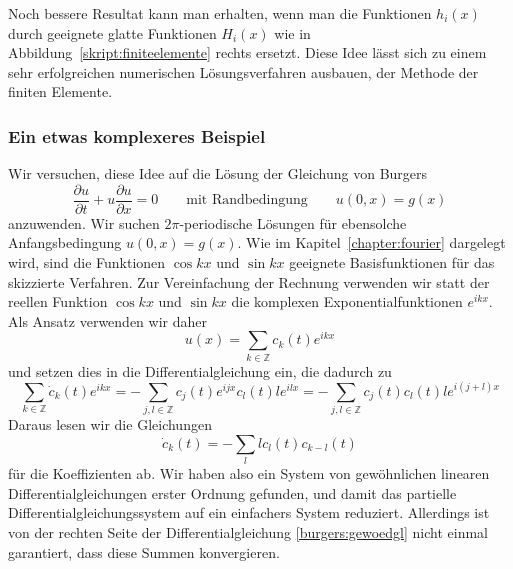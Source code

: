 Noch bessere Resultat kann man erhalten, wenn man die Funktionen
$h_i(x)$ durch geeignete glatte Funktionen $H_i(x)$ wie in
Abbildung~\ref{skript:finiteelemente} rechts ersetzt.
Diese Idee lässt sich zu einem sehr erfolgreichen numerischen
Lösungsverfahren ausbauen, der Methode der finiten Elemente.

\subsubsection{Ein etwas komplexeres Beispiel}
Wir versuchen, diese Idee auf die Lösung der Gleichung von
Burgers
\begin{equation}
\frac{\partial u}{\partial t} + u\frac{\partial u}{\partial x}=0
\qquad\text{mit Randbedingung}\qquad
u(0,x)=g(x)
\label{skript:pde:burgersequation}
\end{equation}
anzuwenden.
Wir suchen $2\pi$-periodische Lösungen für ebensolche Anfangsbedingung
$u(0,x)=g(x)$.
Wie im Kapitel~\ref{chapter:fourier} dargelegt wird, sind die Funktionen
$\cos kx$ und $\sin kx$ geeignete Basisfunktionen für das skizzierte Verfahren.
Zur Vereinfachung der Rechnung verwenden wir statt der reellen Funktion
$\cos kx$ und $\sin kx$ die komplexen Exponentialfunktionen $e^{ikx}$.
Als Ansatz verwenden wir daher
\[
u(x) = \sum_{k\in\mathbb Z} c_k(t) e^{ikx}
\]
und setzen dies in die Differentialgleichung ein, die dadurch zu
\[
\sum_{k\in\mathbb Z} \dot c_k(t) e^{ikx}
=
-\sum_{j,l\in\mathbb Z} c_j(t)e^{ijx} c_l(t) le^{ilx}
=
-\sum_{j,l\in\mathbb Z} c_j(t)c_l(t) le^{i(j+l)x}
\]
Daraus lesen wir die Gleichungen
\begin{equation}
\dot c_k(t) = -\sum_{l} lc_l(t)c_{k-l}(t)
\label{burgers:gewoedgl}
\end{equation}
für die Koeffizienten ab.
Wir haben also ein System von gewöhnlichen linearen Differentialgleichungen
erster Ordnung gefunden, und damit das partielle Differentialgleichungssystem
auf ein einfachers System reduziert.
Allerdings ist von der rechten Seite der Differentialgleichung
\eqref{burgers:gewoedgl}
nicht einmal garantiert, dass diese Summen konvergieren.

